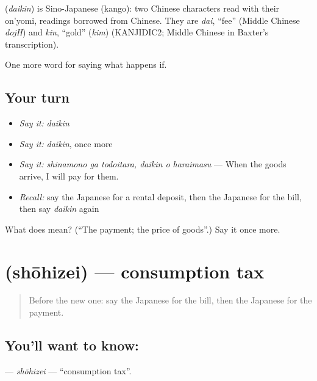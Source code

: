 \begin{cousinweb}
\textbf{} (\emph{daikin}) is Sino-Japanese (kango): two Chinese characters read with their on'yomi, readings borrowed from Chinese. They are \emph{dai}, \textquotedblleft{}fee\textquotedblright{} (Middle Chinese \emph{dojH}) and \emph{kin}, \textquotedblleft{}gold\textquotedblright{} (\emph{kim}) (KANJIDIC2; Middle Chinese in Baxter's transcription).
\end{cousinweb}

\begin{grammarlens}[title={What you've built}]
One more word for saying what happens if.
\end{grammarlens}

\subsection*{Your turn}
\begin{itemize}
\raggedright
  \item \emph{Say it:} \emph{daikin}
  \item \emph{Say it:} \emph{daikin}, once more
  \item \emph{Say it:} \emph{shinamono ga todoitara, daikin o haraimasu} — When the goods arrive, I will pay for them.
  \item \emph{Recall:} say the Japanese for a rental deposit, then the Japanese for the bill, then say \emph{daikin} again
\end{itemize}

\begin{tcolorbox}[breakable,colback=teal!4,colframe=teal!35!black,title={Before you move on}]
What does  mean? (\textquotedblleft{}The payment; the price of goods\textquotedblright{}.) Say it once more.
\end{tcolorbox}
\section[\texorpdfstring{\ja{しょうひぜい} (shōhizei)}{しょうひぜい (shōhizei)}]{ (shōhizei) — consumption tax}

\label{lesson:JA-C363-shouhizei}



\begin{quote}
Before the new one: say the Japanese for the bill, then the Japanese for the payment.
\end{quote}

\subsection*{You'll want to know: }
\textbf{} — \emph{shōhizei} — \textquotedblleft{}consumption tax\textquotedblright{}.


